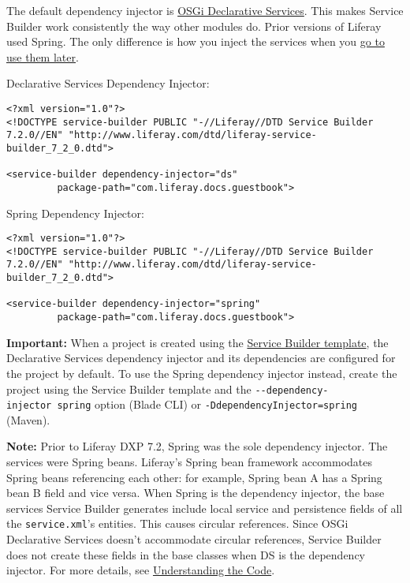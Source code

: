 The default dependency injector is
\href{/docs/7-2/frameworks/-/knowledge_base/f/declarative-services}{OSGi
Declarative Services}. This makes Service Builder work consistently the
way other modules do. Prior versions of Liferay used Spring. The only
difference is how you inject the services when you
\href{/docs/7-2/appdev/-/knowledge_base/a/invoking-local-services}{go to
use them later}.

Declarative Services Dependency Injector:

\begin{verbatim}
<?xml version="1.0"?>
<!DOCTYPE service-builder PUBLIC "-//Liferay//DTD Service Builder 7.2.0//EN" "http://www.liferay.com/dtd/liferay-service-builder_7_2_0.dtd">

<service-builder dependency-injector="ds"
         package-path="com.liferay.docs.guestbook">
\end{verbatim}

Spring Dependency Injector:

\begin{verbatim}
<?xml version="1.0"?>
<!DOCTYPE service-builder PUBLIC "-//Liferay//DTD Service Builder 7.2.0//EN" "http://www.liferay.com/dtd/liferay-service-builder_7_2_0.dtd">

<service-builder dependency-injector="spring"
         package-path="com.liferay.docs.guestbook">
\end{verbatim}

\noindent\hrulefill

\textbf{Important:} When a project is created using the
\href{/docs/7-2/reference/-/knowledge_base/r/using-the-service-builder-template}{Service
Builder template}, the Declarative Services dependency injector and its
dependencies are configured for the project by default. To use the
Spring dependency injector instead, create the project using the Service
Builder template and the \texttt{-\/-dependency-injector\ spring} option
(Blade CLI) or \texttt{-DdependencyInjector=spring} (Maven).

\noindent\hrulefill

\noindent\hrulefill

\textbf{Note:} Prior to Liferay DXP 7.2, Spring was the sole dependency
injector. The services were Spring beans. Liferay's Spring bean
framework accommodates Spring beans referencing each other: for example,
Spring bean A has a Spring bean B field and vice versa. When Spring is
the dependency injector, the base services Service Builder generates
include local service and persistence fields of all the
\texttt{service.xml}'s entities. This causes circular references. Since
OSGi Declarative Services doesn't accommodate circular references,
Service Builder does not create these fields in the base classes when DS
is the dependency injector. For more details, see
\href{understanding-the-code-generated-by-service-builder}{Understanding
the Code}.

